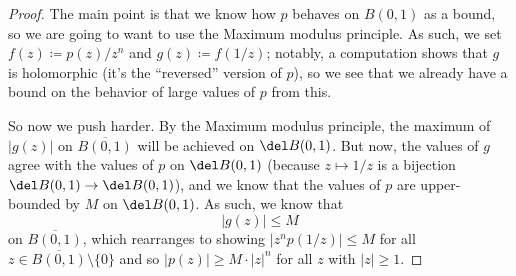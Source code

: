 \begin{proof}
	The main point is that we know how $p$ behaves on $B(0,1)$ as a bound, so we are going to want to use the Maximum modulus principle. As such, we set $f(z)\coloneqq p(z)/z^n$ and $g(z)\coloneqq f(1/z)$; notably, a computation shows that $g$ is holomorphic (it's the ``reversed'' version of $p$), so we see that we already have a bound on the behavior of large values of $p$ from this.

	So now we push harder. By the Maximum modulus principle, the maximum of $|g(z)|$ on $\overline{B(0,1)}$ will be achieved on $\del B(0,1)$. But now, the values of $g$ agree with the values of $p$ on $\del B(0,1)$ (because $z\mapsto1/z$ is a bijection $\del B(0,1)\to\del B(0,1)$), and we know that the values of $p$ are upper-bounded by $M$ on $\del B(0,1)$. As such, we know that
	\[|g(z)|\le M\]
	on $\overline{B(0,1)}$, which rearranges to showing $\left|z^np(1/z)\right|\le M$ for all $z\in\overline{B(0,1)}\setminus\{0\}$ and so $|p(z)|\ge M\cdot|z|^n$ for all $z$ with $|z|\ge1$.
\end{proof}

